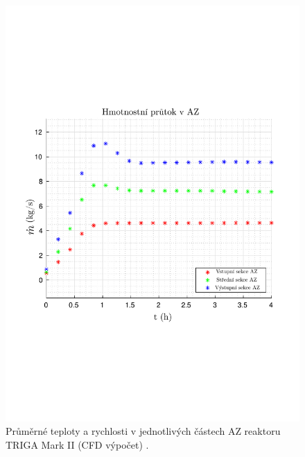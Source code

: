 \begin{figure}[H]
\begin{minipage}{.5\textwidth}
		\includegraphics[width=\linewidth, trim={1cm 7cm 1cm 7cm}, clip]{./06_hodnoceni_TH_modelu/obrazky/cfd_triga_mass_flow_rate.pdf}
	\end{minipage}
	\caption{Průměrné teploty a rychlosti v jednotlivých částech AZ reaktoru TRIGA Mark II (CFD výpočet) \cite{TRIGA_CFD}.}
	\label{fig:cfd_triga_temperatures_velocities}
\end{figure}
